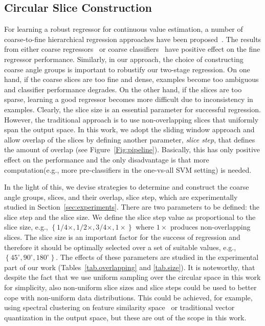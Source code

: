 \documentclass{tutmscthesis}[2010/09/22]
\numberwithin{equation}{section}
\numberwithin{table}{section}
\numberwithin{figure}{section}
\begin{document}
\subsection{Circular Slice Construction}
\label{sec:circular_slice}
For learning a robust regressor for continuous value estimation, a
number of coarse-to-fine hierarchical regression approaches have been
proposed~\cite{dantone2014body,dantone2012real,foytik2013two,liu2015age}.  
The results from either coarse regressors~\cite{dantone2014body} or
coarse classifiers~\cite{dantone2012real,foytik2013two,liu2015age} have
positive effect on the fine regressor performance.  
Similarly, in our approach, the choice of constructing coarse angle groups
is important to robustify our two-stage regression.
On one hand, if the coarse slices are too fine and
dense, examples become too ambiguous and classifier performance
degrades.
On the other hand, if the slices are too sparse, learning
a good regressor becomes more difficult due to inconsistency in
examples. Clearly, the slice size is an
essential parameter for successful regression. However, the traditional
approach is to use non-overlapping slices that uniformly span the
output space. In this work, we adopt the sliding window approach and
allow overlap of the slices by defining another parameter,
{\em slice step}, that defines the amount of overlap
(see Figure~\ref{Fig:pipeline}). 
Basically, this has only positive effect on the performance and the only disadvantage is that more computation(e.g., more pre-classifiers in the
one-vs-all SVM setting) is needed.

In the light of this, we devise strategies to determine and construct
the coarse angle groups, slices, and their overlap, slice step, which
are experimentally studied in Section~\ref{sec:experiments}. There are two parameters
to be defined: the slice step and the slice size. 
We define the slice step value as proportional to the
slice size, e.g.,
$\left\{1/4\times, 1/2\times, 3/4\times, 1\times\right\}$ where
$1\times$ produces non-overlapping slices.
The slice size is an important factor for the success of regression and therefore
it should be optimally selected over a set of
suitable values, e.g.,
$\left\{45^\circ, 90^\circ, 180^\circ\right\}$. 
The effects of these parameters are studied in the experimental part of our work (Tables~\ref{tab.overlapping} and \ref{tab.size}). 
It is noteworthy, that despite the
fact that we use uniform sampling over the circular
space in this work for simplicity, also non-uniform slice sizes and slice steps
could be used to better cope with non-uniform data distributions.
This could be achieved, for example, using spectral clustering
on feature similarity space~\cite{zelnik2004self} or traditional
vector quantization in the output space, but these are out of
the scope in this work.
\end{document}
